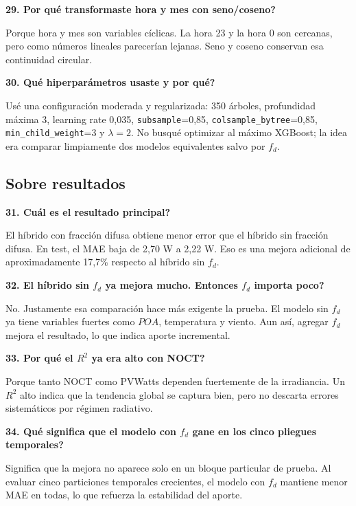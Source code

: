 \documentclass[11pt, letterpaper]{article}
\newcommand{\fd}{f_d}
\begin{document}
\textbf{29. \textquestiondown Por qu\'e transformaste hora y mes con seno/coseno?}

Porque hora y mes son variables c\'iclicas. La hora 23 y la hora 0 son cercanas, pero como n\'umeros lineales parecer\'ian lejanas. Seno y coseno conservan esa continuidad circular.

\textbf{30. \textquestiondown Qu\'e hiperpar\'ametros usaste y por qu\'e?}

Us\'e una configuraci\'on moderada y regularizada: 350 \'arboles, profundidad m\'axima 3, learning rate 0,035, \texttt{subsample}=0,85, \texttt{colsample\_bytree}=0,85, \texttt{min\_child\_weight}=3 y \(\lambda=2\). No busqu\'e optimizar al m\'aximo XGBoost; la idea era comparar limpiamente dos modelos equivalentes salvo por \(\fd\).

\subsection{Sobre resultados}

\textbf{31. \textquestiondown Cu\'al es el resultado principal?}

El h\'ibrido con fracci\'on difusa obtiene menor error que el h\'ibrido sin fracci\'on difusa. En test, el MAE baja de 2,70 W a 2,22 W. Eso es una mejora adicional de aproximadamente 17,7\% respecto al h\'ibrido sin \(\fd\).

\textbf{32. \textquestiondown El h\'ibrido sin \(\fd\) ya mejora mucho. Entonces \(\fd\) importa poco?}

No. Justamente esa comparaci\'on hace m\'as exigente la prueba. El modelo sin \(\fd\) ya tiene variables fuertes como \(POA\), temperatura y viento. Aun as\'i, agregar \(\fd\) mejora el resultado, lo que indica aporte incremental.

\textbf{33. \textquestiondown Por qu\'e el \(R^2\) ya era alto con NOCT?}

Porque tanto NOCT como PVWatts dependen fuertemente de la irradiancia. Un \(R^2\) alto indica que la tendencia global se captura bien, pero no descarta errores sistem\'aticos por r\'egimen radiativo.

\textbf{34. \textquestiondown Qu\'e significa que el modelo con \(\fd\) gane en los cinco pliegues temporales?}

Significa que la mejora no aparece solo en un bloque particular de prueba. Al evaluar cinco particiones temporales crecientes, el modelo con \(\fd\) mantiene menor MAE en todas, lo que refuerza la estabilidad del aporte.
\end{document}
